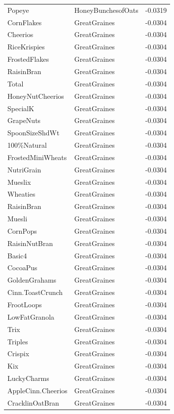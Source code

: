 \begin{table}[!htbp]
\begin{tabular}{lll}
Popeye & HoneyBunchesofOats & -0.0319
\\
CornFlakes & GreatGraines & -0.0304
\\
Cheerios & GreatGraines & -0.0304
\\
RiceKrispies & GreatGraines & -0.0304
\\
FrostedFlakes & GreatGraines & -0.0304
\\
RaisinBran & GreatGraines & -0.0304
\\
Total & GreatGraines & -0.0304
\\
HoneyNutCheerios & GreatGraines & -0.0304
\\
SpecialK & GreatGraines & -0.0304
\\
GrapeNuts & GreatGraines & -0.0304
\\
SpoonSizeShdWt & GreatGraines & -0.0304
\\
100\%Natural & GreatGraines & -0.0304
\\
FrostedMiniWheats & GreatGraines & -0.0304
\\
NutriGrain & GreatGraines & -0.0304
\\
Mueslix & GreatGraines & -0.0304
\\
Wheaties & GreatGraines & -0.0304
\\
RaisinBran & GreatGraines & -0.0304
\\
Muesli & GreatGraines & -0.0304
\\
CornPops & GreatGraines & -0.0304
\\
RaisinNutBran & GreatGraines & -0.0304
\\
Basic4 & GreatGraines & -0.0304
\\
CocoaPus & GreatGraines & -0.0304
\\
GoldenGrahams & GreatGraines & -0.0304
\\
Cinn.ToastCrunch & GreatGraines & -0.0304
\\
FrootLoops & GreatGraines & -0.0304
\\
LowFatGranola & GreatGraines & -0.0304
\\
Trix & GreatGraines & -0.0304
\\
Triples & GreatGraines & -0.0304
\\
Crispix & GreatGraines & -0.0304
\\
Kix & GreatGraines & -0.0304
\\
LuckyCharms & GreatGraines & -0.0304
\\
AppleCinn.Cheerios & GreatGraines & -0.0304
\\
CracklinOatBran & GreatGraines & -0.0304
\\

\end{tabular}
\end{table}

